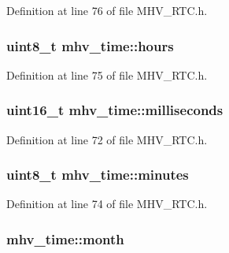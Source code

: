 \-Definition at line 76 of file \-M\-H\-V\-\_\-\-R\-T\-C.\-h.

\hypertarget{structmhv__time_a86216ab6b58bede2c74b8b38745c81f7}{
\subsubsection[{hours}]{\setlength{\rightskip}{0pt plus 5cm}uint8\-\_\-t {\bf mhv\-\_\-time\-::hours}}}
\label{structmhv__time_a86216ab6b58bede2c74b8b38745c81f7}


\-Definition at line 75 of file \-M\-H\-V\-\_\-\-R\-T\-C.\-h.

\hypertarget{structmhv__time_a88f1e6b1d010c2f21b11bd335b1fae65}{
\subsubsection[{milliseconds}]{\setlength{\rightskip}{0pt plus 5cm}uint16\-\_\-t {\bf mhv\-\_\-time\-::milliseconds}}}
\label{structmhv__time_a88f1e6b1d010c2f21b11bd335b1fae65}


\-Definition at line 72 of file \-M\-H\-V\-\_\-\-R\-T\-C.\-h.

\hypertarget{structmhv__time_a72c1e9925d2d3de254c6550c0b309347}{
\subsubsection[{minutes}]{\setlength{\rightskip}{0pt plus 5cm}uint8\-\_\-t {\bf mhv\-\_\-time\-::minutes}}}
\label{structmhv__time_a72c1e9925d2d3de254c6550c0b309347}


\-Definition at line 74 of file \-M\-H\-V\-\_\-\-R\-T\-C.\-h.

\hypertarget{structmhv__time_a832c57e459789022fb39b7c704a3e926}{
\subsubsection[{month}]{ {\bf mhv\-\_\-time\-::month}}}
\label{structmhv__time_a832c57e459789022fb39b7c704a3e926}


